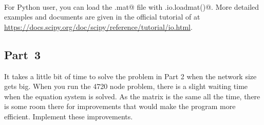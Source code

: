 \documentclass[11pt,a4paper]{article}
\begin{document}
\medskip
{}\\
For Python user, you can load the \verb@.mat@ file with \verb@scipy.io.loadmat()@.
More detailed examples and documents are given in the official tutorial of  \verb@scipy@ at \url{https://docs.scipy.org/doc/scipy/reference/tutorial/io.html}.


\subsection*{Part~3}
It takes a little bit of time to solve the problem in Part 2 when the network size gets big. When you run the 4720 node problem, there is a slight waiting time when the equation system is solved. As the matrix is the same all the time, there is some room there for improvements that would make the program more efficient. Implement these improvements.
\end{document}
